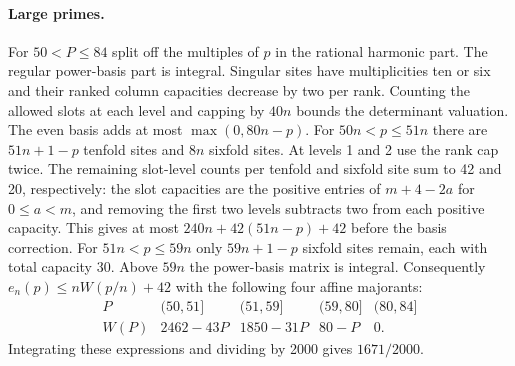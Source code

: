 \documentclass[11pt]{article}
\begin{document}
\paragraph{Large primes.}
For $50<P\le84$ split off the multiples of $p$ in the rational harmonic
part. The regular power-basis part is integral. Singular sites have
multiplicities ten or six and their ranked column capacities decrease by
two per rank. Counting the allowed slots at each level and capping by
$40n$ bounds the determinant valuation. The even basis adds at most
$\max(0,80n-p)$. For $50n<p\le51n$ there are $51n+1-p$ tenfold sites and
$8n$ sixfold sites. At levels 1 and 2 use the rank cap twice. The
remaining slot-level counts per tenfold and sixfold site sum to 42 and
20, respectively: the slot capacities are the positive entries of
$m+4-2a$ for $0\le a<m$, and removing the first two levels subtracts
two from each positive capacity. This gives at most
$240n+42(51n-p)+42$ before the basis correction.
For $51n<p\le59n$ only $59n+1-p$ sixfold sites remain, each with
total capacity 30. Above $59n$ the power-basis matrix is integral.
Consequently $e_n(p)\le n W(p/n)+42$ with the following four
affine majorants:
\[
\begin{array}{c|cccc}
 P&(50,51]&(51,59]&(59,80]&(80,84]\\ \hline
 W(P)&2462-43P&1850-31P&80-P&0 .
\end{array}
\]
Integrating these expressions and dividing by 2000 gives $1671/2000$.
\end{document}
